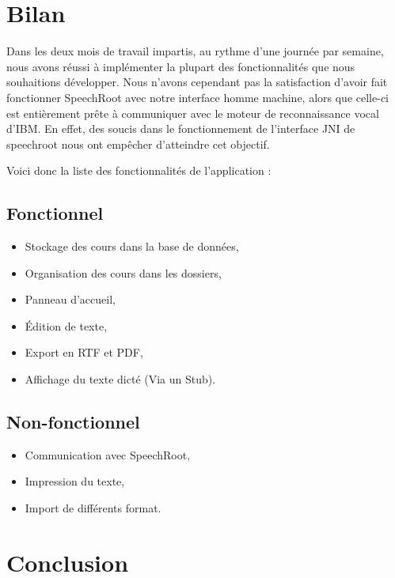 \documentclass[a4paper,11pt]{report}
\begin{document}







\chapter{Bilan}

Dans les deux mois de travail impartis, au rythme d'une journée par semaine, nous avons réussi à implémenter la plupart des fonctionnalités que nous souhaitions développer. 
Nous n'avons cependant pas la satisfaction d'avoir fait fonctionner SpeechRoot avec notre interface homme machine, alors que celle-ci est entièrement prête à communiquer avec le moteur de reconnaissance vocal d'IBM.
En effet, des soucis dans le fonctionnement de l'interface JNI de speechroot nous ont empêcher d'atteindre cet objectif.

Voici donc la liste des fonctionnalités de l'application :

\section{Fonctionnel}
\begin{itemize}
	\item Stockage des cours dans la base de données,
	\item Organisation des cours dans les dossiers,
	\item Panneau d'accueil,
	\item Édition de texte,
	\item Export en RTF et PDF,
	\item Affichage du texte dicté (Via un Stub).
\end{itemize}

\section{Non-fonctionnel}
\begin{itemize}
	\item Communication avec SpeechRoot,
	\item Impression du texte,
	\item Import de différents format.	
\end{itemize}


\chapter{Conclusion}
\end{document}

